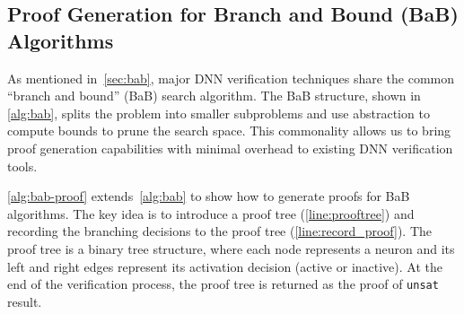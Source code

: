 \documentclass[oneside,11pt,dvipsnames]{book}
\newcommand{\bab}{\texttt{BaB$_{\text{NV}}$}}
\newcommand{\neuralsat}{\texttt{NeuralSAT}}
\begin{document}


\subsection{Proof Generation for Branch and Bound (BaB) Algorithms}\label{sec:proogen}

As mentioned in~\autoref{sec:bab}, major DNN verification techniques share the common ``branch and bound'' (BaB) search algorithm. The BaB structure, shown in~ \autoref{alg:bab}, splits the problem into smaller subproblems and use abstraction to compute bounds to prune the search space. This commonality allows us to bring proof generation capabilities with minimal overhead to existing DNN verification tools.

\autoref{alg:bab-proof} extends~\autoref{alg:bab} to show how to generate proofs for BaB algorithms. The key idea is to introduce a proof tree (\autoref{line:prooftree}) and recording the branching decisions to the proof tree (\autoref{line:record_proof}).
The proof tree is a binary tree structure, where each node represents a neuron and its left and right edges represent its activation decision (active or inactive).
At the end of the verification process, the proof tree is returned as the proof of \texttt{unsat} result. 



\end{document}
